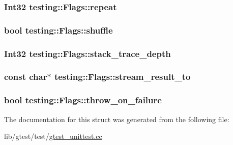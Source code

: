 \hypertarget{structtesting_1_1_flags_a61614dd07f97f6e04d27c004ff15195e}{
\subsubsection[{repeat}]{\setlength{\rightskip}{0pt plus 5cm}Int32 testing\-::\-Flags\-::repeat}}\label{structtesting_1_1_flags_a61614dd07f97f6e04d27c004ff15195e}
\hypertarget{structtesting_1_1_flags_a51c689e47e0f55c16116ac2a1d3b05d6}{
\subsubsection[{shuffle}]{\setlength{\rightskip}{0pt plus 5cm}bool testing\-::\-Flags\-::shuffle}}\label{structtesting_1_1_flags_a51c689e47e0f55c16116ac2a1d3b05d6}
\hypertarget{structtesting_1_1_flags_a20c6592453909c1adace64bf6a2bc2de}{
\subsubsection[{stack\-\_\-trace\-\_\-depth}]{\setlength{\rightskip}{0pt plus 5cm}Int32 testing\-::\-Flags\-::stack\-\_\-trace\-\_\-depth}}\label{structtesting_1_1_flags_a20c6592453909c1adace64bf6a2bc2de}
\hypertarget{structtesting_1_1_flags_ab09849fd3e095d5628dec65ec4dce9e1}{
\subsubsection[{stream\-\_\-result\-\_\-to}]{\setlength{\rightskip}{0pt plus 5cm}const char$\ast$ testing\-::\-Flags\-::stream\-\_\-result\-\_\-to}}\label{structtesting_1_1_flags_ab09849fd3e095d5628dec65ec4dce9e1}
\hypertarget{structtesting_1_1_flags_ab8e7d21e31e641efe47b8050759e001a}{
\subsubsection[{throw\-\_\-on\-\_\-failure}]{\setlength{\rightskip}{0pt plus 5cm}bool testing\-::\-Flags\-::throw\-\_\-on\-\_\-failure}}\label{structtesting_1_1_flags_ab8e7d21e31e641efe47b8050759e001a}


The documentation for this struct was generated from the following file\-:\begin{DoxyCompactItemize}
\item 
lib/gtest/test/\hyperlink{gtest__unittest_8cc}{gtest\-\_\-unittest.\-cc}\end{DoxyCompactItemize}
